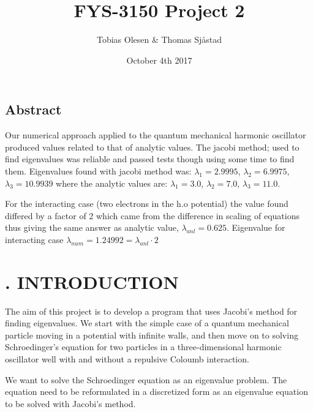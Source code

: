 \documentclass[twocolumn]{article}
\title{FYS-3150 Project 2}
\author{Tobias Olesen & Thomas Sjåstad}
\date{October 4th 2017}
\begin{document}
\maketitle
\onecolumngrid
\noindent\makebox[\linewidth]{\rule{\paperwidth}{0.4pt}}
\begin{center}
\section*{Abstract} 
Our numerical approach applied to the quantum mechanical harmonic oscillator produced values related to that of analytic values. The jacobi method; used to find eigenvalues was reliable and passed tests though using some time to find them. Eigenvalues found with jacobi method was: $\lambda_1 = 2.9995$, $\lambda_2 = 6.9975$, $\lambda_3 = 10.9939$ where the analytic values are: $\lambda_1 = 3.0$, $\lambda_2 = 7.0$, $\lambda_3 = 11.0$. 

For the interacting case (two electrons in the h.o potential) the value found differed by a factor of 2 which came from the difference in scaling of equations thus giving the same answer as analytic value, $\lambda_{anl} = 0.625$. Eigenvalue for interacting case $\lambda_{num} = 1.24992 = \lambda_{anl}\cdot2$  
\end{center}  
\noindent\makebox[\linewidth]{\rule{\paperwidth}{0.4pt}}
\newline
\twocolumngrid
\section*{. INTRODUCTION}
The aim of this project is to develop a program that uses Jacobi's method for finding eigenvalues. We start with the simple case of a quantum mechanical particle moving in a potential with infinite walls, and then move on to solving Schroedinger's equation for two particles in a three-dimensional harmonic oscillator well with and without a repulsive Coloumb interaction.

We want to solve the Schroedinger equation as an eigenvalue problem.
The equation need to be reformulated in a discretized form as an eigenvalue equation to be solved with Jacobi's method.
\end{document}
